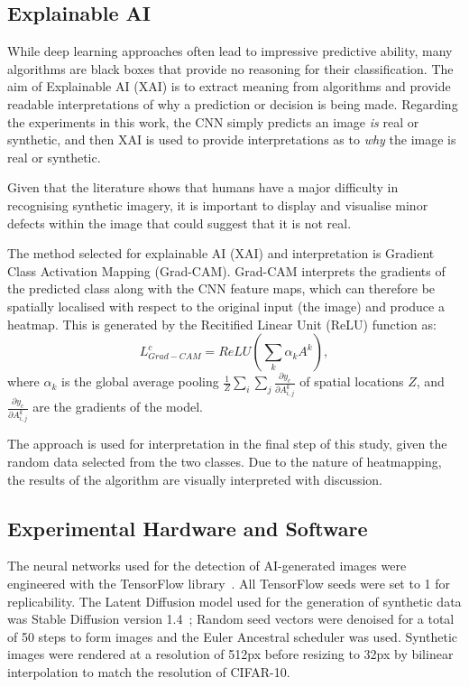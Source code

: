 \documentclass{article}
\begin{document}
\subsection{Explainable AI}
\label{subsec:xai}
While deep learning approaches often lead to impressive predictive ability, many algorithms are black boxes that provide no reasoning for their classification. The aim of Explainable AI (XAI) is to extract meaning from algorithms and provide readable interpretations of why a prediction or decision is being made\cite{gunning2019xai}. Regarding the experiments in this work, the CNN simply predicts an image \textit{is} real or synthetic, and then XAI is used to provide interpretations as to \textit{why} the image is real or synthetic. 

Given that the literature shows that humans have a major difficulty in recognising synthetic imagery, it is important to display and visualise minor defects within the image that could suggest that it is not real.

The method selected for explainable AI (XAI) and interpretation is Gradient Class Activation Mapping (Grad-CAM)\cite{selvaraju2017grad}. Grad-CAM interprets the gradients of the predicted class along with the CNN feature maps, which can therefore be spatially localised with respect to the original input (the image) and produce a heatmap. This is generated by the Recitified Linear Unit (ReLU) function as:
\begin{equation}
    L_{Grad-CAM}^{c} = ReLU(\sum_k\alpha_kA^k), 
\end{equation}
where $\alpha_k$ is the global average pooling $\frac{1}{Z}\sum_i\sum_j\frac{\partial y_c}{\partial A_{i,j}^k}$ of spatial locations $Z$, and $\frac{\partial y_c}{\partial A_{i,j}^k}$ are the gradients of the model. 

The approach is used for interpretation in the final step of this study, given the random data selected from the two classes. Due to the nature of heatmapping, the results of the algorithm are visually interpreted with discussion.

\subsection{Experimental Hardware and Software}
\label{subsec:hardwaresoftware}
The neural networks used for the detection of AI-generated images were engineered with the TensorFlow library~\cite{tensorflow2015-whitepaper}. All TensorFlow seeds were set to 1 for replicability. The Latent Diffusion model used for the generation of synthetic data was Stable Diffusion version 1.4~\cite{rombach2022high}; Random seed vectors were denoised for a total of 50 steps to form images and the Euler Ancestral scheduler was used. Synthetic images were rendered at a resolution of 512px before resizing to 32px by bilinear interpolation to match the resolution of CIFAR-10.
\end{document}
